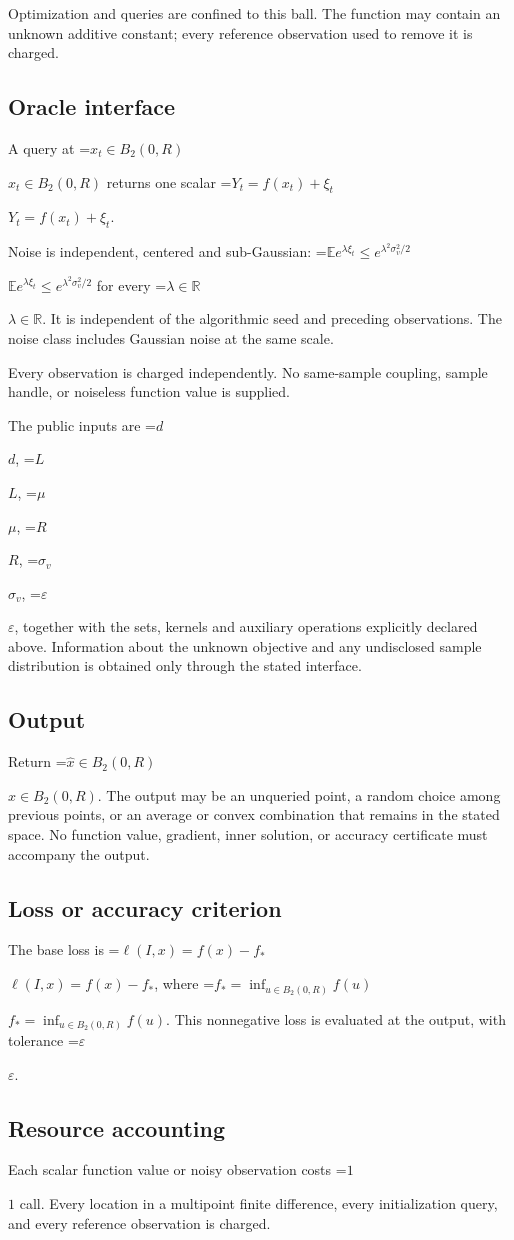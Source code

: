 \documentclass[10pt,a4paper]{article}
\newcommand{\AtlasMath}[1]{\par\begingroup\centering\setbox0=\hbox{$\displaystyle #1$}\ifdim\wd0>1.4\linewidth\typeout{ATLAS WIDE FORMULA: \the\wd0}\fi\ifdim\wd0>\linewidth\resizebox{\linewidth}{!}{\box0}\else\box0\fi\par\endgroup}
\newcommand{\AtlasInlineMath}[1]{\begingroup\setbox0=\hbox{$#1$}\ifdim\wd0>.4\linewidth\endgroup\AtlasMath{#1}\else\endgroup$#1$\fi}
\begin{document}
Optimization and queries are confined to this ball. The function may contain an unknown additive constant; every reference observation used to remove it is charged.

\subsection{Oracle interface}
A query at \AtlasInlineMath{x_t\in B_2(0,R)} returns one scalar \AtlasInlineMath{Y_t=f(x_t)+\xi_t}.

Noise is independent, centered and sub-Gaussian: \AtlasInlineMath{\mathbb{E} e^{\lambda\xi_t}\le e^{\lambda^2 \sigma_v^2/2}} for every \AtlasInlineMath{\lambda\in\mathbb{R}}. It is independent of the algorithmic seed and preceding observations. The noise class includes Gaussian noise at the same scale.

Every observation is charged independently. No same-sample coupling, sample handle, or noiseless function value is supplied.

The public inputs are \AtlasInlineMath{d}, \AtlasInlineMath{L}, \AtlasInlineMath{\mu}, \AtlasInlineMath{R}, \AtlasInlineMath{\sigma_v}, \AtlasInlineMath{\varepsilon}, together with the sets, kernels and auxiliary operations explicitly declared above. Information about the unknown objective and any undisclosed sample distribution is obtained only through the stated interface.

\subsection{Output}
Return \AtlasInlineMath{\widehat{x}\in B_2(0,R)}. The output may be an unqueried point, a random choice among previous points, or an average or convex combination that remains in the stated space. No function value, gradient, inner solution, or accuracy certificate must accompany the output.

\subsection{Loss or accuracy criterion}
The base loss is \AtlasInlineMath{\ell(I,x)=f(x)-f_*}, where \AtlasInlineMath{f_*=\inf_{u\in B_2(0,R)}f(u)}. This nonnegative loss is evaluated at the output, with tolerance \AtlasInlineMath{\varepsilon}.

\subsection{Resource accounting}
Each scalar function value or noisy observation costs \AtlasInlineMath{1} call. Every location in a multipoint finite difference, every initialization query, and every reference observation is charged.
\end{document}
